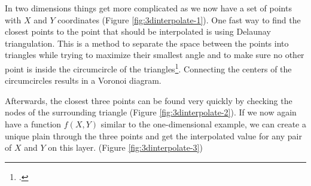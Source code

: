 In two dimensions things get more complicated as we now have a set of points with $X$ and $Y$ coordinates (Figure \ref{fig:3dinterpolate-1}). One fast way to find the closest points to the point that should be interpolated is using Delaunay triangulation. This is a method to separate the space between the points into triangles while trying to maximize their smallest angle and to make sure no other point is inside the circumcircle of the triangles\footcite{Delaunay}. Connecting the centers of the circumcircles results in a Voronoi diagram.  

Afterwards, the closest three points can be found very quickly by checking the nodes of the surrounding triangle  (Figure \ref{fig:3dinterpolate-2}). If we now again have a function $f(X,Y)$ similar to the one-dimensional example, we can create a unique plain through the three points and get the interpolated value for any pair of $X$ and $Y$ on this layer. (Figure \ref{fig:3dinterpolate-3})


